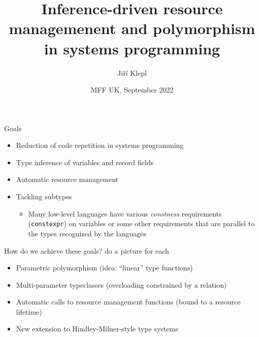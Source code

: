 \documentclass[aspectratio=169]{beamer}
\author{Jiří Klepl}
\title{Inference-driven resource managemenent and polymorphism in systems programming} %
\date{MFF UK, September 2022}
\newcommand{\xxx}[1]{\textcolor{red!}{#1}}
\begin{document}
\maketitle

%
%

\begin{frame}{Goals}
  \begin{itemize}
    \item Reduction of code repetition in systems programming
    \item Type inference of variables and record fields
    \item Automatic resource management
    \item Tackling subtypes
      \begin{itemize}
        \item Many low-level languages have various \emph{constness} requirements (\lstinline{constexpr}) on variables or some other requirements that are parallel to the types recognized by the languages
      \end{itemize}
  \end{itemize}
  \pause
  How do we achieve these goals? \xxx{do a picture for each}
  \pause
  \begin{itemize}
    \item Parametric polymorphism (idea: ``linear'' type functions)
    \item Multi-parameter typeclasses (overloading constrained by a relation)
    \item Automatic calls to resource management functions (bound to a resource lifetime)
    \item New extension to Hindley-Milner-style type systems
  \end{itemize}
\end{frame}
\end{document}
